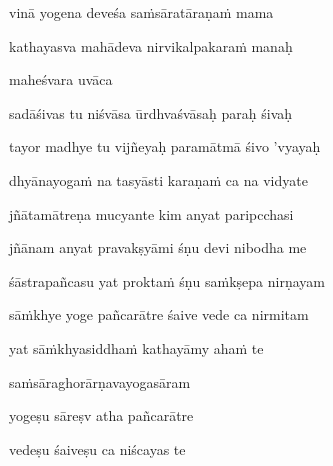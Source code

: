 vinā yogena deveśa saṁsāratāraṇaṁ mama\thinspace{\danda} \dontdisplaylinenum

kathayasva mahādeva nirvikalpakaraṁ manaḥ \veg\dontdisplaylinenum
{}

maheśvara uvāca~{\dandab}\dontdisplaylinenum 
{}

sadāśivas tu niśvāsa ūrdhvaśvāsaḥ paraḥ śivaḥ\thinspace{\danda} \dontdisplaylinenum

tayor madhye tu vijñeyaḥ paramātmā śivo 'vyayaḥ \veg\dontdisplaylinenum
{}

dhyānayogaṁ na tasyāsti karaṇaṁ ca na vidyate\thinspace{\dandab} \dontdisplaylinenum

jñātamātreṇa mucyante kim anyat paripcchasi \veg\dontdisplaylinenum



jñānam anyat pravakṣyāmi śṇu devi nibodha me\thinspace{\dandab} \dontdisplaylinenum

śāstrapañcasu yat proktaṁ śṇu saṁkṣepa nirṇayam \danda\dontdisplaylinenum

sāṁkhye yoge pañcarātre śaive vede ca nirmitam \veg\dontdisplaylinenum
{}

\ujvers\nemsloka 
yat sāṁkhyasiddhaṁ kathayāmy ahaṁ te
\dontdisplaylinenum

\nemslokab 
saṁsāraghorārṇavayogasāram \danda\dontdisplaylinenum

\nemslokac 
yogeṣu sāreṣv atha pañcarātre
\dontdisplaylinenum

\nemslokad 
vedeṣu śaiveṣu ca niścayas te \veg\dontdisplaylinenum
{}

